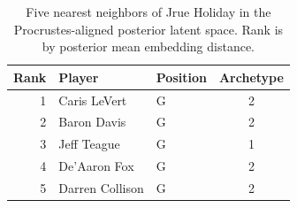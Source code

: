 \begin{table}[htbp]
  \centering\small
  \begin{tabular}{rllc}
    \toprule
    Rank & Player & Position & Archetype \\
    \midrule
    1 & Caris LeVert & G & 2 \\
    2 & Baron Davis & G & 2 \\
    3 & Jeff Teague & G & 1 \\
    4 & De'Aaron Fox & G & 2 \\
    5 & Darren Collison & G & 2 \\
    \bottomrule
  \end{tabular}
  \caption{Five nearest neighbors of Jrue Holiday in the Procrustes-aligned posterior latent space. Rank is by posterior mean embedding distance.}
  \label{tab:Jrue_Holiday_neighbors}
\end{table}

